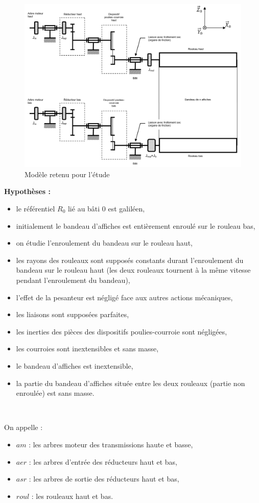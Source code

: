  \begin{figure}[!h]
\begin{center}
	\includegraphics[width=0.8\linewidth]{img/fig11}
\end{center}
	\caption{Modèle retenu pour l'étude}
	\label{fig11}
\end{figure}

\textbf{Hypothèses :}
\begin{itemize}
 \item le référentiel $R_0$ lié au bâti 0 est galiléen,
 \item initialement le bandeau d'affiches est entièrement enroulé sur le rouleau bas,
 \item on étudie l'enroulement du bandeau sur le rouleau haut,
 \item les rayons des rouleaux sont supposés constants durant l'enroulement du bandeau sur le rouleau haut (les deux rouleaux tournent à la même vitesse pendant l'enroulement du bandeau),
 \item l'effet de la pesanteur est négligé face aux autres actions mécaniques,
 \item les liaisons sont supposées parfaites,
 \item les inerties des pièces des dispositifs poulies-courroie sont négligées,
 \item les courroies sont inextensibles et sans masse,
 \item le bandeau d'affiches est inextensible,
 \item la partie du bandeau d'affiches située entre les deux rouleaux (partie non enroulée) est sans masse.
\end{itemize}

~\

On appelle :
\begin{itemize}
 \item $am$ : les arbres moteur des transmissions haute et basse,
 \item $aer$ : les arbres d'entrée des réducteurs haut et bas,
 \item $asr$ : les arbres de sortie des réducteurs haut et bas,
 \item $roul$ : les rouleaux haut et bas.
\end{itemize}

